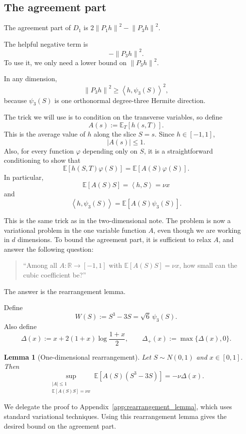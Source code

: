 \documentclass[11pt]{article}
\newtheorem{lemma}[theorem]{Lemma}
\numberwithin{equation}{section}
\newcommand{\R}{\mathbb R}
\newcommand{\E}{\mathbb E}
\newcommand{\ip}[2]{\left\langle #1,#2\right\rangle}
\newcommand{\norm}[1]{\left\|#1\right\|}
\begin{document}
\subsection{The agreement part}
\label{sec:agreement}

The agreement part of $D_1$ is $2\norm{P_1h}^2-\norm{P_3h}^2$.

The helpful negative term is
\[
        -\norm{P_3h}^2.
\]
To use it, we only need a lower bound on $\norm{P_3h}^2$.

In any dimension,
\[
        \norm{P_3h}^2
        \ge \ip{h}{\psi_3(S)}^2,
\]
because $\psi_3(S)$ is one orthonormal degree-three Hermite direction.

The trick we will use is to condition on the transverse variables, so define
\[
        A(s):=\E_T[h(s,T)].
\]
This is the average value of $h$ along the slice $S=s$. Since $h\in[-1,1]$,
\[
        |A(s)|\le1.
\]
Also, for every function $\varphi$ depending only on $S$, it is a straightforward conditioning to show that
\[
        \E[h(S,T)\varphi(S)]=\E[A(S)\varphi(S)].
\]
In particular,
\[
        \E[A(S)S]=\ip{h}{S}=\nu x
\]
and
\[
        \ip{h}{\psi_3(S)}=\E[A(S)\psi_3(S)].
\]

This is the same trick as in the two-dimensional note. The problem is now a variational problem in the one variable function $A$, even though we are working in $d$ dimensions. To bound the agreement part, it is sufficient to relax $A$, and answer the following question:

\begin{quote}
``Among all $A:\R\to[-1,1]$ with $\E[A(S)S]=\nu x$, how small can the cubic coefficient be?''
\end{quote}

The answer is the rearrangement lemma.

Define
\[
        W(S):=S^3-3S=\sqrt6\,\psi_3(S).
\]
Also define
\[
        \Delta(x):=x+2(1+x)\log\frac{1+x}{2},
        \qquad
        \Delta_+(x):=\max\{\Delta(x),0\}.
\]

\begin{lemma}[One-dimensional rearrangement]
Let $S\sim N(0,1)$ and $x\in[0,1]$. Then
\[
        \sup_{\substack{|A|\le1\\ \E[A(S)S]=\nu x}}
        \E[A(S)(S^3-3S)]
        =-\nu\Delta(x).
\]
\end{lemma}

We delegate the proof to Appendix~\ref{app:rearrangement_lemma}, which uses standard variational techniques. Using this rearrangement lemma gives the desired bound on the agreement part.
\end{document}
